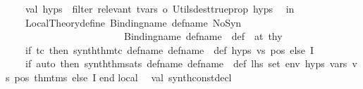 \begin{isabellebody}
\ \ \ \ val\ hyps{\isacharprime}{\kern0pt}\ {\isacharequal}{\kern0pt}\ filter\ {\isacharparenleft}{\kern0pt}relevant\ t{\isacharunderscore}{\kern0pt}vars\ o\ Utils{\isachardot}{\kern0pt}dest{\isacharunderscore}{\kern0pt}trueprop{\isacharparenright}{\kern0pt}\ hyps\isanewline
\ \ in\isanewline
\ \ \ \ Local{\isacharunderscore}{\kern0pt}Theory{\isachardot}{\kern0pt}define\ {\isacharparenleft}{\kern0pt}{\isacharparenleft}{\kern0pt}Binding{\isachardot}{\kern0pt}name\ def{\isacharunderscore}{\kern0pt}name{\isacharcomma}{\kern0pt}\ NoSyn{\isacharparenright}{\kern0pt}{\isacharcomma}{\kern0pt}\isanewline
\ \ \ \ \ \ \ \ \ \ \ \ \ \ \ \ \ \ \ \ \ \ \ \ {\isacharparenleft}{\kern0pt}{\isacharparenleft}{\kern0pt}Binding{\isachardot}{\kern0pt}name\ {\isacharparenleft}{\kern0pt}def{\isacharunderscore}{\kern0pt}name\ {\isacharcircum}{\kern0pt}\ {\isachardoublequote}{\kern0pt}{\isacharunderscore}{\kern0pt}def{\isachardoublequote}{\kern0pt}{\isacharparenright}{\kern0pt}{\isacharcomma}{\kern0pt}\ {\isacharbrackleft}{\kern0pt}{\isacharbrackright}{\kern0pt}{\isacharparenright}{\kern0pt}{\isacharcomma}{\kern0pt}\ at{\isacharparenright}{\kern0pt}{\isacharparenright}{\kern0pt}\ thy\ {\isacharbar}{\kern0pt}{\isachargreater}{\kern0pt}\ {\isacharhash}{\kern0pt}{}\ {\isacharbar}{\kern0pt}{\isachargreater}{\kern0pt}\isanewline
\ \ \ \ {\isacharparenleft}{\kern0pt}if\ tc\ then\ synth{\isacharunderscore}{\kern0pt}thm{\isacharunderscore}{\kern0pt}tc\ def{\isacharunderscore}{\kern0pt}name\ {\isacharparenleft}{\kern0pt}def{\isacharunderscore}{\kern0pt}name\ {\isacharcircum}{\kern0pt}\ {\isachardoublequote}{\kern0pt}{\isacharunderscore}{\kern0pt}def{\isachardoublequote}{\kern0pt}{\isacharparenright}{\kern0pt}\ hyps{\isacharprime}{\kern0pt}\ vs\ pos\ else\ I{\isacharparenright}{\kern0pt}\ {\isacharbar}{\kern0pt}{\isachargreater}{\kern0pt}\isanewline
\ \ \ \ {\isacharparenleft}{\kern0pt}if\ auto\ then\ synth{\isacharunderscore}{\kern0pt}thm{\isacharunderscore}{\kern0pt}sats\ def{\isacharunderscore}{\kern0pt}name\ {\isacharparenleft}{\kern0pt}def{\isacharunderscore}{\kern0pt}name\ {\isacharcircum}{\kern0pt}\ {\isachardoublequote}{\kern0pt}{\isacharunderscore}{\kern0pt}def{\isachardoublequote}{\kern0pt}{\isacharparenright}{\kern0pt}\ lhs\ set\ env\ hyps\ vars\ vs\ pos\ thm{\isacharunderscore}{\kern0pt}tms\ else\ I{\isacharparenright}{\kern0pt}\isanewline
\isanewline
end\isanewline
{\isacartoucheclose}\isanewline
{}\isamarkupfalse%
{\isacartoucheopen}\isanewline
\isanewline
local\isanewline
\ \ val\ synth{\isacharunderscore}{\kern0pt}constdecl\ {\isacharequal}{\kern0pt}\isanewline

\end{isabellebody}
